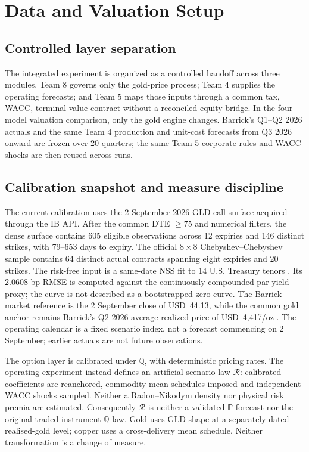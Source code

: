 \section{Data and Valuation Setup}

\subsection{Controlled layer separation}
The integrated experiment is organized as a controlled handoff across three modules. Team 8 governs only the gold-price process; Team 4 supplies the operating forecasts; and Team 5 maps those inputs through a common tax, WACC, terminal-value contract without a reconciled equity bridge. In the four-model valuation comparison, only the gold engine changes. Barrick's Q1--Q2 2026 actuals and the same Team 4 production and unit-cost forecasts from Q3 2026 onward are frozen over 20 quarters; the same Team 5 corporate rules and WACC shocks are then reused across runs.



\subsection{Calibration snapshot and measure discipline}
The current calibration uses the 2 September 2026 GLD call surface acquired through the IB API. After the common DTE $\geq75$ and numerical filters, the dense surface contains 605 eligible observations across 12 expiries and 146 distinct strikes, with 79--653 days to expiry. The official $8\times8$ Chebyshev--Chebyshev sample contains 64 distinct actual contracts spanning eight expiries and 20 strikes. The risk-free input is a same-date NSS fit to 14 U.S. Treasury tenors \citep{nss1994,treasury2026}. Its 2.0608 bp RMSE is computed against the continuously compounded par-yield proxy; the curve is not described as a bootstrapped zero curve. The Barrick market reference is the 2 September close of USD~44.13, while the common gold anchor remains Barrick's Q2 2026 average realized price of USD~4,417/oz \citep{barrick2026}. The operating calendar is a fixed scenario index, not a forecast commencing on 2 September; earlier actuals are not future observations.

The option layer is calibrated under $\mathbb Q$, with deterministic pricing rates. The operating experiment instead defines an artificial scenario law $\mathcal R$: calibrated coefficients are reanchored, commodity mean schedules imposed and independent WACC shocks sampled. Neither a Radon--Nikodym density nor physical risk premia are estimated. Consequently $\mathcal R$ is neither a validated $\mathbb P$ forecast nor the original traded-instrument $\mathbb Q$ law. Gold uses GLD shape at a separately dated realised-gold level; copper uses a cross-delivery mean schedule. Neither transformation is a change of measure.

